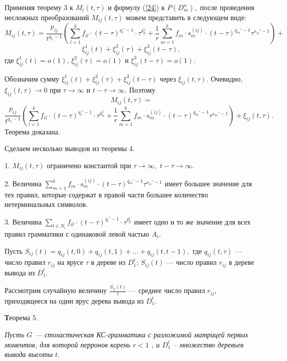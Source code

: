 \documentclass[%
11pt,a4paper]{article}
\begin{document}
{{{Применяя теорему 3 к $M_i(t,\tau)$ и формулу (\ref{24}) к $P(D_m^{n}),$ после проведения несложных преобразований
$M_{ij}(t,\tau)$ можем представить в следующем виде:
$$
M_{ij}(t,\tau)=
\frac{p_{ij}}{t^{q_1-1}} \left(\sum_{l =1}^k f_{il} \cdot (t-\tau)^{q_l'-1}\cdot \tau^{\delta_{il}^1}+
\frac{1}{{r }} \sum_{m=1}^k f_m\cdot s_m^{(ij)}\cdot
 (t-\tau)^{q_m'-1}\tau^{s_{1i}'-1}\right)+
$$
$$
\xi^1_{ij}(t)+\xi^2_{ij}(\tau)+\xi^3_{ij}(t-\tau),
$$
где $\xi^1_{ij}(t)=o(1)$, $\xi^2_{ij}(\tau)=o(1)$ и
$\xi^3_{ij}(t-\tau)=o(1).$

Обозначим сумму $\xi^1_{ij}(t)+\xi^2_{ij}(\tau)+\xi^3_{ij}(t-\tau)$ через
$\xi_{ij}(t,\tau).$
Очевидно, $\xi_{ij}(t,\tau) \rightarrow 0$ при
$\tau \rightarrow \infty$ и $t-\tau \rightarrow \infty.$
Поэтому
$$
M_{ij}(t,\tau) =
$$
\begin{equation}
\frac{p_{ij}}{t^{q_1-1}} \left(\sum_{l =1}^k f_{il} \cdot (t-\tau)^{q_l'-1}\cdot \tau^{\delta_{il}^1}+
\frac{1}{{r }} \sum_{m=1}^k f_m\cdot s_m^{(ij)}\cdot
 (t-\tau)^{q_m'-1}\tau^{s_{1i}'-1}\right)+ \xi_{ij}(t,\tau).
\label{34}
\end{equation}
Теорема доказана.

\medskip

Сделаем несколько выводов из теоремы 4.

1. $M_{ij}(t,\tau)$ ограничено константой
при $\tau \rightarrow \infty,$ $t-\tau \rightarrow \infty.$

2. Величина $\sum_{m=1}^k f_m \cdot s_m^{(ij)}\cdot
 (t-\tau)^{q_m'-1}\tau^{s_{1i}'-1}$ имеет большее значение для тех правил, которые
содержат в правой части большее количество нетерминальных символов.

3. Величина $\sum_{l \in N_i} f_{il} \cdot (t-\tau)^{q_l'-1}\cdot \tau^{\delta_{il}^1}$ имеет одно и то же значение для всех
правил грамматики с одинаковой левой частью $A_i.$

\medskip

Пусть $S_{ij}(t)=q_{ij}(t,0)+q_{ij}(t,1)+\ldots +q_{ij}(t,t-1),$
где $q_{ij}(t,\tau)$ --- число правил $r_{ij}$ на ярусе $\tau$ в дереве
из $D_1^t$; $S_{ij}(t)$ --- число правил $r_{ij}$ в дереве вывода из $D_1^t$.

Рассмотрим случайную величину $\frac{S_{ij}(t)}{t}$ --- среднее число правил $r_{ij}$,
приходящееся на один ярус дерева вывода из $D_1^t.$

\medskip

{\textbf Теорема 5.}
{\em Пусть $G$ --- стохастическая КС-грамматика с разложимой
матрицей первых моментов, для которой перронов корень $r<1$ , и $D^t_1$ -- множество деревьев вывода
высоты $t.$

}}}}
\end{document}
